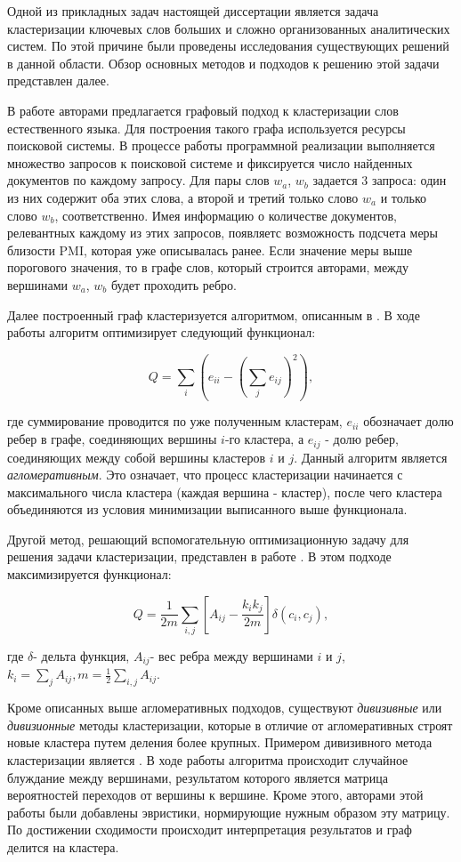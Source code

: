 
Одной из прикладных задач настоящей диссертации является задача кластеризации ключевых слов больших и сложно организованных аналитических систем. По этой причине были проведены исследования существующих решений в данной области. Обзор основных методов и подходов к решению этой задачи представлен далее.

В работе \cite{word_cluster_web} авторами предлагается графовый подход к кластеризации слов естественного языка. Для построения такого графа используется ресурсы поисковой системы. В процессе работы программной реализации выполняется множество запросов к поисковой системе и фиксируется число найденных документов по каждому запросу. Для пары слов $w_a$, $w_b$ задается 3 запроса: один из них содержит оба этих слова, а второй и третий только слово $w_a$ и только слово $w_b$, соответственно. Имея информацию о количестве документов, релевантных каждому из этих запросов, появляетс возможность подсчета меры близости PMI, которая уже описывалась ранее. Если значение меры выше порогового значения, то в графе слов, который строится авторами, между вершинами $w_a$, $w_b$ будет проходить ребро.

Далее построенный граф кластеризуется алгоритмом, описанным в \cite{clustering_newman}. В ходе работы алгоритм оптимизирует следующий функционал:

$$ Q = \sum_{i} \left(e_{ii} - \left(\sum_{j} e_{ij}\right)^2\right), $$

где суммирование проводится по уже полученным кластерам, $e_{ii}$ обозначает долю ребер в графе, соединяющих вершины $i$-го кластера, а $e_{ij}$ - долю ребер, соединяющих между собой вершины кластеров $i$ и $j$. Данный алгоритм является \emph{агломеративным}. Это означает, что процесс кластеризации начинается с максимального числа кластера (каждая вершина - кластер), после чего кластера объединяются из условия минимизации выписанного выше функционала.

Другой метод, решающий вспомогательную оптимизационную задачу для решения задачи кластеризации, представлен в работе \cite{louvain_modularity}. В этом подходе максимизируется функционал:

$$ Q = \frac{1}{2m}\sum_{i,j}[A_{ij} - \frac{k_i k_j}{2m}]\delta(c_i, c_j), $$

где $\delta$- дельта функция, $A_{ij}$- вес ребра между вершинами $i$ и $j$, $k_i=\sum_j{A_{ij}}, m=\frac{1}{2}\sum_{i,j}A_{ij}$.

Кроме описанных выше агломеративных подходов, существуют \emph{дивизивные} или \emph{дивизионные} методы кластеризации, которые в отличие от агломеративных строят новые кластера путем деления более крупных. Примером дивизивного метода кластеризации является \cite{clustering_mcl}. В ходе работы алгоритма происходит случайное блуждание между вершинами, результатом которого является матрица вероятностей переходов от вершины к вершине. Кроме этого, авторами этой работы были добавлены эвристики, нормирующие нужным образом эту матрицу. По достижении сходимости происходит интерпретация результатов и граф делится на кластера. 

